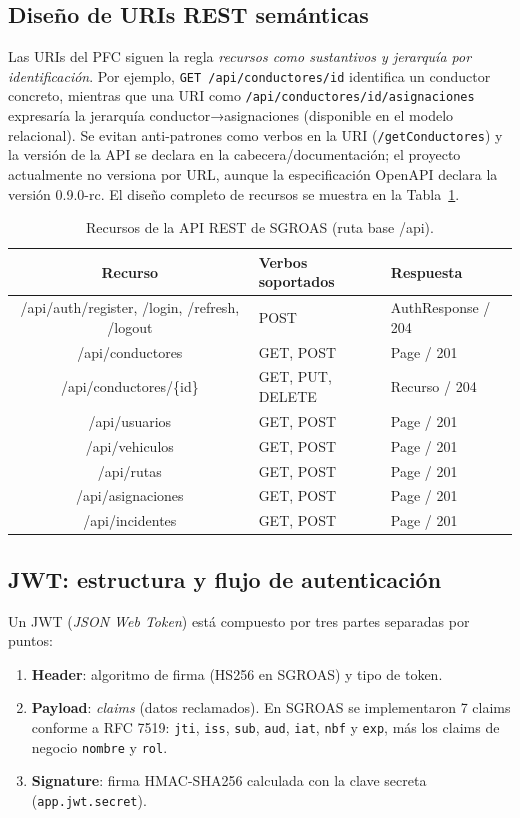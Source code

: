 \subsection{Diseño de URIs REST semánticas}

Las URIs del PFC siguen la regla \textit{recursos como sustantivos y jerarquía por identificación}. Por ejemplo,
\texttt{GET /api/conductores/{id}} identifica un conductor concreto, mientras que una URI como
\texttt{/api/conductores/{id}/asignaciones} expresaría la jerarquía conductor→asignaciones (disponible en el modelo
relacional). Se evitan anti-patrones como verbos en la URI (\texttt{/getConductores}) y la versión de la API se
declara en la cabecera/documentación; el proyecto actualmente no versiona por URL, aunque la especificación
OpenAPI declara la versión 0.9.0-rc. El diseño completo de recursos se muestra en la Tabla~\ref{tab:uris}.

\begin{table}[H]
\centering
\small
\begin{tabular}{@{}cll@{}}
\toprule
\textbf{Recurso} & \textbf{Verbos soportados} & \textbf{Respuesta} \\
\midrule
/api/auth/register, /login, /refresh, /logout & POST & AuthResponse / 204 \\
/api/conductores & GET, POST & Page / 201 \\
/api/conductores/\{id\} & GET, PUT, DELETE & Recurso / 204 \\
/api/usuarios & GET, POST & Page / 201 \\
/api/vehiculos & GET, POST & Page / 201 \\
/api/rutas & GET, POST & Page / 201 \\
/api/asignaciones & GET, POST & Page / 201 \\
/api/incidentes & GET, POST & Page / 201 \\
\bottomrule
\end{tabular}
\caption{Recursos de la API REST de SGROAS (ruta base /api).}
\label{tab:uris}
\end{table}

\subsection{JWT: estructura y flujo de autenticación}

Un JWT (\textit{JSON Web Token}) está compuesto por tres partes separadas por puntos:
\begin{enumerate}
    \item \textbf{Header}: algoritmo de firma (HS256 en SGROAS) y tipo de token.
    \item \textbf{Payload}: \textit{claims} (datos reclamados). En SGROAS se implementaron 7 claims conforme a
    RFC 7519: \texttt{jti}, \texttt{iss}, \texttt{sub}, \texttt{aud}, \texttt{iat}, \texttt{nbf} y \texttt{exp},
    más los claims de negocio \texttt{nombre} y \texttt{rol}.
    \item \textbf{Signature}: firma HMAC-SHA256 calculada con la clave secreta (\texttt{app.jwt.secret}).
\end{enumerate}

